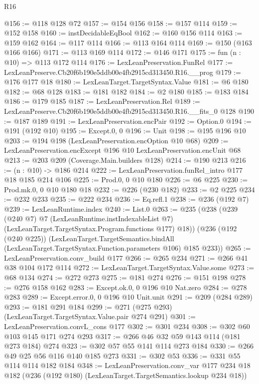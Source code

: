 \begin{lexlean}{R16}
\begin{coremodule}
@156 := @118 @128 @72
@157 := @154 @156
@158 := @157 @114
@159 := @152 @158
@160 := instDecidableEqBool
@162 := @160 @156 @114
@163 := @159 @162
@164 := @117 @114
@166 := @113 @164 @114
@169 := @150 (@163 @166 @166)
@171 := @113 @169 @114
@172 := @146 @171
@175 := fun (n : @10) => @113 @172 @114
@176 := LexLeanPreservation.FunRel
@177 := LexLeanPreserve.Cb20f6b190e5ddb00e4fb2915cd313450.R16.__prog
@179 := @176 @177 @18
@180 := LexLeanTarget.TargetSyntax.Value
@181 := @6 @180
@182 := @68 @128
@183 := @181 @182
@184 := @2 @180
@185 := @183 @184
@186 := @179 @185
@187 := LexLeanPreservation.Rel
@189 := LexLeanPreserve.Cb20f6b190e5ddb00e4fb2915cd313450.R16.__fits_0 @128
@190 := @187 @189
@191 := LexLeanPreservation.encPair
@192 := Option.{0}
@194 := @191 (@192 @10)
@195 := Except.{0, 0}
@196 := Unit
@198 := @195 @196 @10
@203 := @194 @198 (LexLeanPreservation.encOption @10 @68)
@209 := LexLeanPreservation.encExcept @196 @10 LexLeanPreservation.encUnit @68
@213 := @203 @209 (Coverage.Main.builders @128)
@214 := @190 @213
@216 := (n : @10) -> @186 @214
@222 := LexLeanPreservation.funRel_intro @177 @18 @185 @214 @106
@225 := Prod.{0, 0} @10 @180
@226 := @6 @225
@230 := Prod.mk.{0, 0} @10 @180 @18
@232 := @226 (@230 @182)
@233 := @2 @225
@234 := @232 @233
@235 := @222 @234
@236 := Eq.refl.{1}
@238 := @236 (@192 @7)
@239 := LexLeanRuntime.index
@240 := List.{0}
@263 := @235
    (@238
      (@239
        (@240 @7)
        @7
        (LexLeanRuntime.instIndexableList @7)
        (LexLeanTarget.TargetSyntax.Program.functions @177)
        @18))
    (@236
      (@192 (@240 @225))
      (LexLeanTarget.TargetSemantics.bindAll
        (LexLeanTarget.TargetSyntax.Function.parameters @106)
        @185
        @233))
@265 := LexLeanPreservation.conv_build @177
@266 := @265 @234
@271 := @266 @41 @38 @104 @172 @114
@272 := LexLeanTarget.TargetSyntax.Value.some
@273 := @68 @134
@274 := @272 @273
@275 := @181 @274
@276 := @151 @198
@278 := @276 @158 @162
@283 := Except.ok.{0, 0} @196 @10 Nat.zero
@284 := @278 @283
@289 := Except.error.{0, 0} @196 @10 Unit.unit
@291 := @209 (@284 @289)
@293 := @181 @291 @184
@299 := @271 (@275 @293) (LexLeanTarget.TargetSyntax.Value.pair @274 @291)
@301 := LexLeanPreservation.convL_cons @177
@302 := @301 @234
@308 := @302 @60 @103 @145 @171 @274 @293
@317 := @266 @46 @32 @59 @143 @114 (@181 @273 @184) @274
@323 := @302 @57 @55 @141 @114 @273 @184
@330 := @266 @49 @25 @56 @116 @140 @185 @273
@331 := @302 @53
@336 := @331 @55 @114 @114 @182 @184
@348 := LexLeanPreservation.conv_var
    @177
    @234
    @18
    @182
    (@236 (@192 @180) (LexLeanTarget.TargetSemantics.lookup @234 @18))

\end{coremodule}
\end{lexlean}
